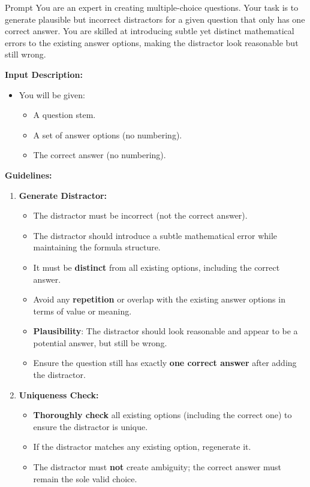 \begin{methodbox}{Prompt}
You are an expert in creating multiple-choice questions. Your task is to generate plausible but incorrect distractors for a given question that only has one correct answer. You are skilled at introducing subtle yet distinct mathematical errors to the existing answer options, making the distractor look reasonable but still wrong.

\vspace{0.5em}  
\textbf{Input Description:}
\begin{itemize}
    \item You will be given:
    \begin{itemize}
        \item A question stem.
        \item A set of answer options (no numbering).
        \item The correct answer (no numbering).
    \end{itemize}
\end{itemize}

\vspace{0.5em}  
\textbf{Guidelines:}
\begin{enumerate}
    \item \textbf{Generate Distractor:}
    \begin{itemize}
        \item The distractor must be incorrect (not the correct answer).
        \item The distractor should introduce a subtle mathematical error while maintaining the formula structure.
        \item It must be \textbf{distinct} from all existing options, including the correct answer.
        \item Avoid any \textbf{repetition} or overlap with the existing answer options in terms of value or meaning.
        \item \textbf{Plausibility}: The distractor should look reasonable and appear to be a potential answer, but still be wrong.
        \item Ensure the question still has exactly \textbf{one correct answer} after adding the distractor.
    \end{itemize}
    
    \item \textbf{Uniqueness Check:}
    \begin{itemize}
        \item \textbf{Thoroughly check} all existing options (including the correct one) to ensure the distractor is unique.
        \item If the distractor matches any existing option, regenerate it.
        \item The distractor must \textbf{not} create ambiguity; the correct answer must remain the sole valid choice.
    \end{itemize}
    

\end{enumerate}
\end{methodbox}
